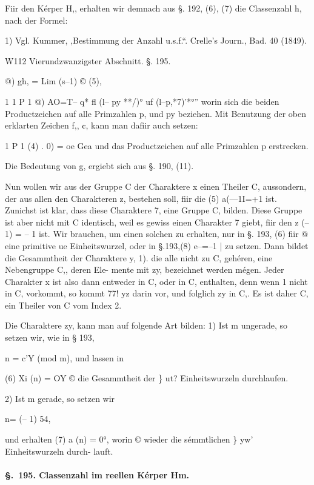 \documentclass[12pt,a4paper]{article}
\theoremstyle{plain}
\theoremstyle{definition}
\begin{document}
Fiir den Kérper H,, erhalten wir demnach aus §. 192, (6), (7) die Classenzahl h, nach der Formel:

1) Vgl. Kummer, ,Bestimmung der Anzahl u.s.f.``. Crelle's Journ., Bad. 40 (1849).

W112 Vierundzwanzigster Abschnitt. §. 195.

@) gh, = Lim (s--1) © (5),

1 1 P 1 @) AO=T-- q* fl (l-- py **/)° uf (l--p,*7)'*°'' worin sich die beiden Productzeichen auf alle Primzahlen p, und py beziehen. Mit Benutzung der oben erklarten Zeichen f,, ¢, kann man dafiir auch setzen:

1 P 1 (4) . 0) = oe Gea und das Productzeichen auf alle Primzahlen p erstrecken.

Die Bedeutung von g, ergiebt sich aus §. 190, (11).

Nun wollen wir aus der Gruppe C der Charaktere x einen Theiler C, aussondern, der aus allen den Charakteren z, bestehen soll, fiir die (5) a(---1I=+1 ist. Zunichst ist klar, dass diese Charaktere 7, eine Gruppe C, bilden. Diese Gruppe ist aber nicht mit C identisch, weil es gewiss einen Charakter 7 giebt, fiir den z (-- 1) = -- 1 ist. Wir brauchen, um einen solchen zu erhalten, nur in §. 193, (6) fiir @ eine primitive ue Einheitswurzel, oder in §.193,(8) e--=--1 | zu setzen. Dann bildet die Gesammtheit der Charaktere y, 1). die alle nicht zu C, gehéren, eine Nebengruppe C,, deren Ele- mente mit zy, bezeichnet werden mégen. Jeder Charakter x ist also dann entweder in C, oder in C, enthalten, denn wenn 1 nicht in C, vorkommt, so kommt 77! yz darin vor, und folglich zy in C,. Es ist daher C, ein Theiler von C vom Index 2.

Die Charaktere zy, kann man auf folgende Art bilden: 1) Ist m ungerade, so setzen wir, wie in § 193,

n = c'Y (mod m), und lassen in

(6) Xi (n) = OY © die Gesammtheit der \} ut? Einheitswurzeln durchlaufen.

2) Ist m gerade, so setzen wir

n= (-- 1) 54,

und erhalten (7) a (n) = 0°, worin © wieder die sémmtlichen \} yw' Einheitswurzeln durch- lauft.

\paragraph{\S.~195. Classenzahl im reellen Kérper Hm.}
\end{document}
